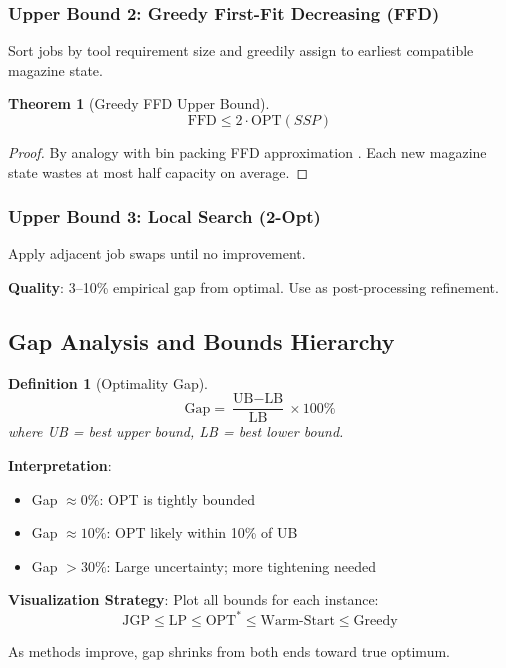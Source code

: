 \documentclass[12pt]{article}
\newtheorem{theorem}{Theorem}[section]
\newtheorem{definition}{Definition}[section]
\begin{document}
	\subsubsection{Upper Bound 2: Greedy First-Fit Decreasing (FFD)}
	
	Sort jobs by tool requirement size and greedily assign to earliest compatible magazine state.
	
	\begin{theorem}[Greedy FFD Upper Bound]
		$$\text{FFD} \le 2 \cdot \text{OPT}(SSP)$$
	\end{theorem}
	\begin{proof}
		By analogy with bin packing FFD approximation \citep{Johnson1973}. Each new magazine state wastes at most half capacity on average.
	\end{proof}
	
	\subsubsection{Upper Bound 3: Local Search (2-Opt)}
	
	Apply adjacent job swaps until no improvement.
	
	\textbf{Quality}: 3--10\% empirical gap from optimal. Use as post-processing refinement.
	
	\subsection{Gap Analysis and Bounds Hierarchy}
	
	\begin{definition}[Optimality Gap]
		$$\text{Gap} = \frac{\text{UB} - \text{LB}}{\text{LB}} \times 100\%$$
		where UB = best upper bound, LB = best lower bound.
	\end{definition}
	
	\textbf{Interpretation}:
	\begin{itemize}
		\item Gap $\approx 0\%$: OPT is tightly bounded
		\item Gap $\approx 10\%$: OPT likely within 10\% of UB
		\item Gap $> 30\%$: Large uncertainty; more tightening needed
	\end{itemize}
	
	\textbf{Visualization Strategy}: Plot all bounds for each instance:
	$$\text{JGP} \le \text{LP} \le \text{OPT}^* \le \text{Warm-Start} \le \text{Greedy}$$
	
	As methods improve, gap shrinks from both ends toward true optimum.
	
\end{document}

